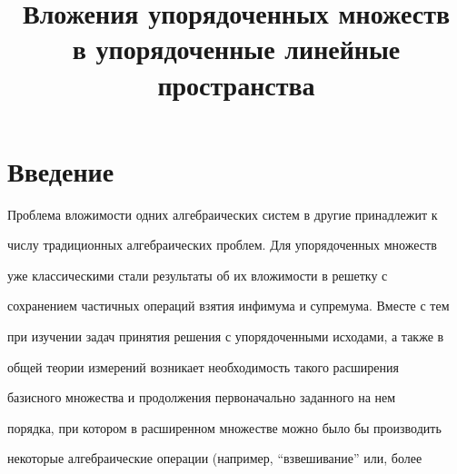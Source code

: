 

\title{Вложения упорядоченных множеств\\ 


в упорядоченные линейные пространства} 


 


\date{} 




 


\pagestyle{plain} %


 


 




 


\maketitle 


\label{begin} 


 


 


\section*{Введение} 


 


Проблема вложимости одних алгебраических систем в другие принадлежит к 


числу традиционных алгебраических проблем. Для упорядоченных множеств 


уже классическими стали результаты об их вложимости в решетку с 


сохранением частичных операций взятия инфимума и супремума. Вместе с тем 


при изучении задач принятия решения с упорядоченными исходами, а также в 


общей теории измерений возникает необходимость такого расширения 


базисного множества и продолжения первоначально заданного на нем 


порядка, при котором в расширенном множестве можно было бы производить 


некоторые алгебраические операции (например, ``взвешивание'' или, более 


